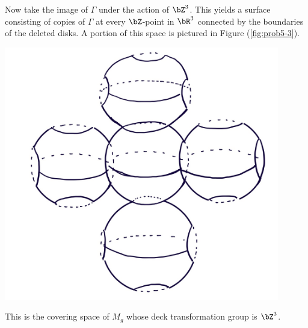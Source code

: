 \begin{homework}[e]
\begin{prf}
    Now take the image of $\Gamma$ under the action of $\bZ^3$. This yields a surface consisting of copies of $\Gamma$ at every $\bZ$-point in $\bR^3$ connected by the boundaries of the deleted disks. A portion of this space is pictured in Figure (\ref{fig:prob5-3}).
    \begin{center}
      \includegraphics[width=12cm]{figures/hwk6-fig7.jpg}
      \label{fig:prob5-3}
    \end{center}
    This is the covering space of $M_g$ whose deck transformation group is $\bZ^3$.
  \end{prf}
\end{homework}


